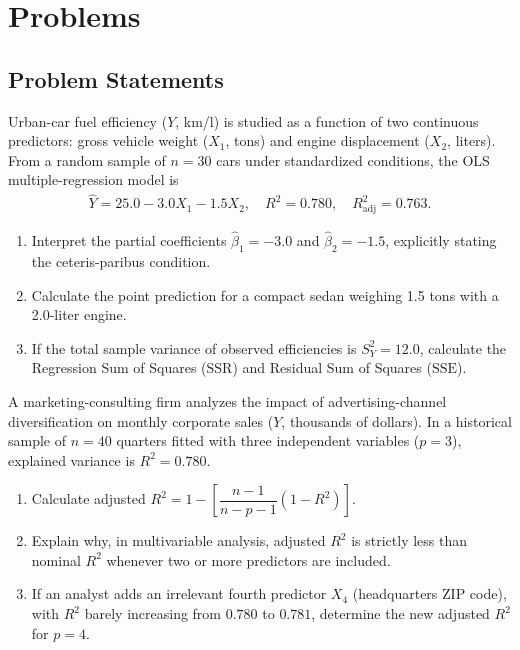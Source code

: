 \section*{Problems}

\subsection*{Problem Statements}

\begin{problema}
\label{prob:0d6ff67}
Urban-car fuel efficiency ($Y$, km/l) is studied as a function of two continuous predictors: gross vehicle weight ($X_1$, tons) and engine displacement ($X_2$, liters). From a random sample of $n=30$ cars under standardized conditions, the OLS multiple-regression model is
\begin{align}
\hat Y=25.0-3.0X_1-1.5X_2,\quad R^2=0.780,\quad R_{\text{adj}}^2=0.763.
\end{align}
\begin{enumerate}
\item Interpret the partial coefficients $\hat\beta_1=-3.0$ and $\hat\beta_2=-1.5$, explicitly stating the ceteris-paribus condition.
\item Calculate the point prediction for a compact sedan weighing 1.5 tons with a 2.0-liter engine.
\item If the total sample variance of observed efficiencies is $S_Y^2=12.0$, calculate the Regression Sum of Squares ($\text{SSR}$) and Residual Sum of Squares ($\text{SSE}$).
\end{enumerate}
\end{problema}

\begin{problema}
\label{prob:9f8863e}
A marketing-consulting firm analyzes the impact of advertising-channel diversification on monthly corporate sales ($Y$, thousands of dollars). In a historical sample of $n=40$ quarters fitted with three independent variables ($p=3$), explained variance is $R^2=0.780$.
\begin{enumerate}
\item Calculate adjusted $R^2=1-\left[\dfrac{n-1}{n-p-1}(1-R^2)\right]$.
\item Explain why, in multivariable analysis, adjusted $R^2$ is strictly less than nominal $R^2$ whenever two or more predictors are included.
\item If an analyst adds an irrelevant fourth predictor $X_4$ (headquarters ZIP code), with $R^2$ barely increasing from $0.780$ to $0.781$, determine the new adjusted $R^2$ for $p=4$.
\end{enumerate}
\end{problema}

